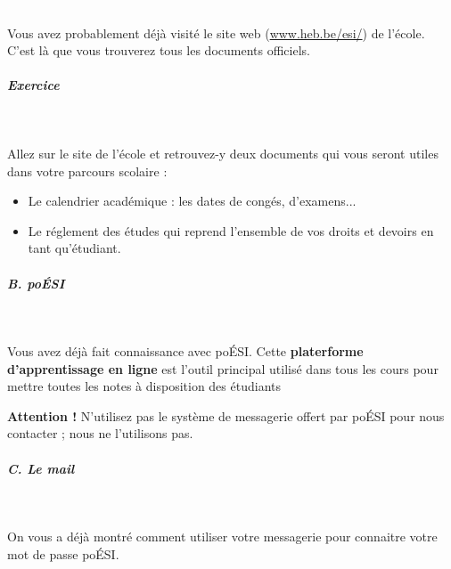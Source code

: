 \documentclass[11pt,a4paper]{article}
\begin{document}
					\textcolor{white}{.} \par
				
				Vous avez probablement d\'ej\`a visit\'e le 
				site web (\url{www.heb.be/esi/})
				de l'\'ecole.
				C'est l\`a que vous trouverez tous les documents
				officiels.
			
            \par
        
			
		\subparagraph{Exercice} 
		
					\textcolor{white}{.} \par
				
				Allez sur le site de l'\'ecole 
				et retrouvez-y deux documents 
				qui vous seront utiles dans votre parcours scolaire :
				
					\begin{itemize}
				
			\item 
						Le calendrier acad\'emique :
						les dates de cong\'es, d'examens...
					
			\item 
						Le r\'eglement des \'etudes qui reprend
						l'ensemble de vos droits et devoirs
						en tant qu'\'etudiant.
					
					\end{itemize}
				
            \par
        
			
		\subparagraph{B. po\'ESI} 
		
					\textcolor{white}{.} \par
				
				Vous avez d\'ej\`a fait connaissance avec po\'ESI.
				Cette 
				\textbf{platerforme d'apprentissage en ligne}
				est l'outil principal utilis\'e dans tous les cours
				pour mettre toutes les notes
				\`a disposition des \'etudiants
			
            \par
        \textbf{Attention !}
				N'utilisez pas le syst\`eme de messagerie
				offert par po\'ESI pour nous contacter ;
				nous ne l'utilisons pas. 
			
            \par
        
			
		\subparagraph{C. Le mail} 
		
					\textcolor{white}{.} \par
				
				On vous a d\'ej\`a montr\'e
				comment utiliser votre messagerie
				pour connaitre votre mot de passe 
				po\'ESI. 
			
\end{document}
